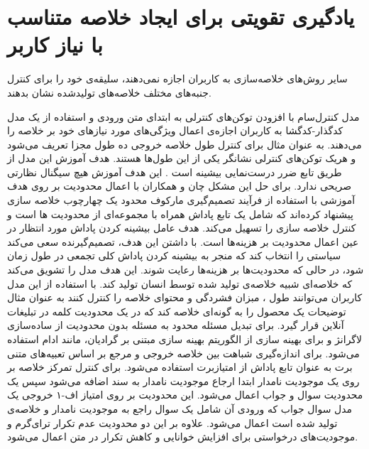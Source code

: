 	  
\section{ یادگیری تقویتی برای ایجاد خلاصه متناسب با نیاز کاربر}
سایر روش‌های خلاصه‌سازی به کاربران اجازه نمی‌دهند، سلیقه‌ی خود را برای کنترل  جنبه‌های مختلف خلاصه‌های تولیدشده نشان بدهند. 

 مدل کنترل‌سام
  با  افزودن توکن‌های کنترلی به ابتدای متن ورودی و استفاده از یک مدل کدگذار-کدگشا به کاربران اجازه‌ی اعمال ویژگی‌های مورد نیازهای خود بر خلاصه را می‌دهند. به عنوان مثال برای کنترل طول خلاصه خروجی ده طول مجزا تعریف می‌شود و هریک توکن‌های کنترلی نشانگر  یکی از این طول‌ها هستند. هدف آموزش این مدل از طریق تابع ضرر درست‌نمایی بیشینه
  است  \cite{fan-etal-2018-controllable}. این هدف آموزش هیچ سیگنال نظارتی صریحی ندارد.
   برای حل این مشکل چان
  و همکاران
  با اعمال محدودیت بر روی هدف آموزشی با استفاده از فرآیند تصمیم‌گیری مارکوف محدود
   یک چهارچوب خلاصه سازی پیشنهاد کرده‌اند که شامل یک تابع پاداش همراه با مجموعه‌ای از  محدودیت ها است و کنترل خلاصه سازی را تسهیل می‌کند. 
   هدف عامل بیشینه کردن  پاداش مورد انتظار در عین اعمال محدودیت بر هزینه‌ها است. 
   با داشتن این هدف، تصمیم‌گیرنده سعی می‌کند سیاستی را انتخاب کند که منجر به بیشینه کردن پاداش کلی تجمعی در طول زمان شود، در حالی که محدودیت‌ها بر هزینه‌ها رعایت شوند.
    این هدف مدل را تشویق می‌کند که خلاصه‌ای شبیه خلاصه‌ی تولید شده توسط انسان تولید کند. با استفاده از این مدل کاربران می‌توانند طول ، مبزان فشردگی و محتوای خلاصه را کنترل کنند به عنوان مثال توضیحات یک محصول را به گونه‌ای خلاصه کند که در یک محدودیت کلمه در تبلیغات آنلاین قرار گیرد.
   برای تبدیل مسئله محدود به مسئله بدون محدودیت   از ساده‌سازی لاگرانژ
   و برای بهینه سازی از الگوریتم بهینه سازی مبتنی بر گرادیان، مانند ادام استفاده می‌شود.
   برای اندازه‌گیری شباهت بین خلاصه خروجی و  مرجع بر اساس تعبیه‌های متنی برت
   به عنوان تابع پاداش از امتیازبرت‌ استفاده می‌شود. 
   برای کنترل تمرکز خلاصه بر روی یک موجودیت نامدار
  ابتدا ارجاع موجودیت نامدار به سند اضافه می‌شود سپس یک محدودیت سوال و جواب اعمال می‌شود. 
  این محدودیت بر روی امتیاز اف‌‌-۱ خروجی یک مدل سوال جواب که ورودی آن شامل یک سوال راجع به موجودیت نامدار و خلاصه‌ی تولید شده است اعمال می‌شود. 
  علاوه بر این دو محدودیت عدم تکرار ترای‌گرم
   و موجودیت‌های درخواستی برای افزایش خوانایی و کاهش تکرار در متن اعمال می‌شود.
